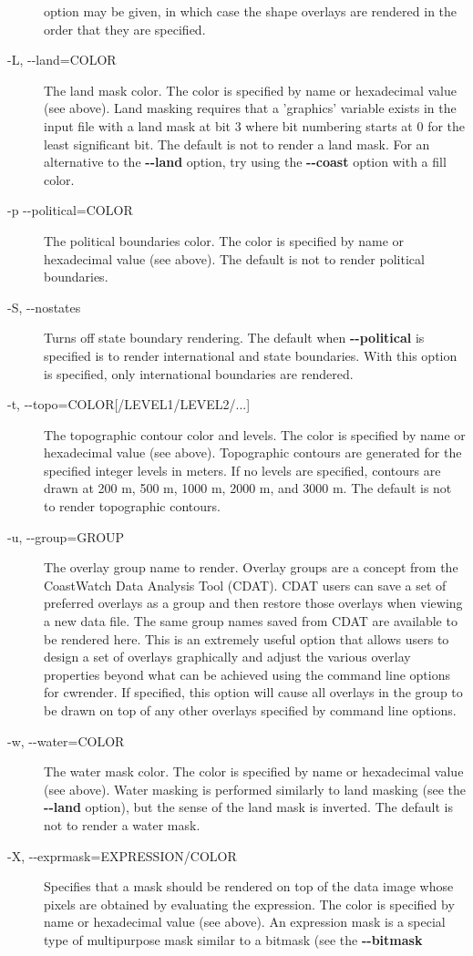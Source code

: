\begin{description}
 option may be given, in which case the shape overlays are rendered in the order that they are specified.
\item[-L, -{-}land=COLOR]The land mask color. The color is specified by name or hexadecimal value (see above). Land masking requires that a 'graphics' variable exists in the input file with a land mask at bit 3 where bit numbering starts at 0 for the least significant bit. The default is not to render a land mask. For an alternative to the \textbf{-{-}land}
 option, try using the \textbf{-{-}coast}
 option with a fill color.
\item[-p -{-}political=COLOR]The political boundaries color. The color is specified by name or hexadecimal value (see above). The default is not to render political boundaries.
\item[-S, -{-}nostates]Turns off state boundary rendering. The default when \textbf{-{-}political}
 is specified is to render international and state boundaries. With this option is specified, only international boundaries are rendered.
\item[-t, -{-}topo=COLOR[/LEVEL1/LEVEL2/...{]}]The topographic contour color and levels. The color is specified by name or hexadecimal value (see above). Topographic contours are generated for the specified integer levels in meters. If no levels are specified, contours are drawn at 200 m, 500 m, 1000 m, 2000 m, and 3000 m. The default is not to render topographic contours.
\item[-u, -{-}group=GROUP]The overlay group name to render. Overlay groups are a concept from the CoastWatch Data Analysis Tool (CDAT). CDAT users can save a set of preferred overlays as a group and then restore those overlays when viewing a new data file. The same group names saved from CDAT are available to be rendered here. This is an extremely useful option that allows users to design a set of overlays graphically and adjust the various overlay properties beyond what can be achieved using the command line options for cwrender. If specified, this option will cause all overlays in the group to be drawn on top of any other overlays specified by command line options.
\item[-w, -{-}water=COLOR]The water mask color. The color is specified by name or hexadecimal value (see above). Water masking is performed similarly to land masking (see the \textbf{-{-}land}
 option), but the sense of the land mask is inverted. The default is not to render a water mask.
\item[-X, -{-}exprmask=EXPRESSION/COLOR]Specifies that a mask should be rendered on top of the data image whose pixels are obtained by evaluating the expression. The color is specified by name or hexadecimal value (see above). An expression mask is a special type of multipurpose mask similar to a bitmask (see the \textbf{-{-}bitmask}

\end{description}
